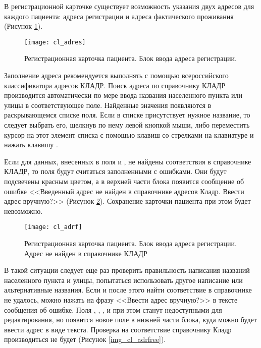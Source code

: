 В регистрационной карточке существует возможность указания двух адресов для каждого пациента: адреса регистрации и адреса фактического проживания (Рисунок \ref{img_cl_adres}). 

\begin{figure}[ht]\centering
 \texttt{[image: cl\_adres]}
 \caption{Регистрационная карточка пациента. Блок ввода адреса регистрации.}
 \label{img_cl_adres}
\end{figure} 

Заполнение адреса рекомендуется выполнять с помощью всероссийского классификатора адресов КЛАДР. Поиск адреса по справочнику КЛАДР производится автоматически по мере ввода названия населенного пункта или улицы в соответствующее поле. Найденные значения появляются в раскрывающемся списке поля. Если в списке присутствует нужное название, то следует выбрать его, щелкнув по нему левой кнопкой мыши, либо переместить курсор на этот элемент списка с помощью клавиш со стрелками на клавиатуре и нажать клавишу .

Если для данных, внесенных в поля  и , не найдены соответствия в справочнике КЛАДР, то поля будут считаться заполненными с ошибками. Они будут подсвечены красным цветом, а в верхней части блока появится сообщение об ошибке <<Введенный адрес не найден в справочнике адресов Кладр. Ввести адрес вручную?>> (Рисунок \ref{img_cl_adrf}). Сохранение карточки пациента при этом будет невозможно. 

\begin{figure}[ht]\centering
 \texttt{[image: cl\_adrf]}
 \caption{Регистрационная карточка пациента. Блок ввода адреса регистрации. Адрес не найден в справочнике КЛАДР}
 \label{img_cl_adrf}
\end{figure} 

В такой ситуации следует еще раз проверить правильность написания названий населенного пункта и улицы, попытаться использовать другое написание или альтернативные названия. Если и после этого найти соответствие в справочнике не удалось, можно нажать на фразу <<Ввести адрес вручную?>> в тексте сообщения об ошибке. Поля  , , ,  и  при этом станут недоступными для редактирования, но появится новое поле  в нижней части блока, куда можно будет ввести адрес в виде текста. Проверка на соответствие справочнику Кладр производиться не будет (Рисунок \ref{img_cl_adrfree}). 

